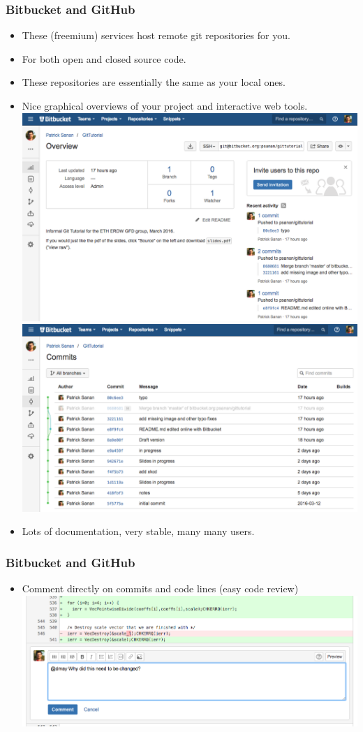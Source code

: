 \documentclass{beamer}
\begin{document}
\begin{frame}[fragile]
\frametitle{Bitbucket and GitHub}
\begin{itemize}
\item These (freemium) services host remote git repositories for you.
\item For both open and closed source code.
\item These repositories are essentially the same as your local ones.
\item Nice graphical overviews of your project and interactive web tools.
\includegraphics[scale=0.15]{bitbucket2}
\includegraphics[scale=0.15]{bitbucket3}
\item Lots of documentation, very stable, many many users.
\end{itemize}
\end{frame}

\begin{frame}[fragile]
\frametitle{Bitbucket and GitHub}
\begin{itemize}
\item Comment directly on commits and code lines (easy code review)
\includegraphics[scale=0.3]{bitbucket1}
\end{itemize}
\end{frame}
\end{document}
